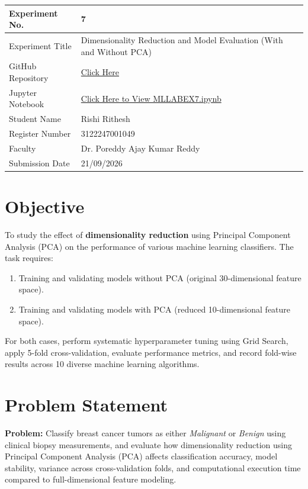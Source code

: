 \documentclass[12pt,a4paper]{article}
\begin{document}
\begin{tabular}{|p{4cm}|p{11cm}|}
\hline
Experiment No. & 7\\ \hline
Experiment Title & Dimensionality Reduction and Model Evaluation (With and Without PCA)\\ \hline
GitHub Repository & \href{https://github.com/rishirithesh/ML_Lab}{Click Here} \\ \hline
Jupyter Notebook & \href{https://github.com/rishirithesh/ML_Lab/blob/main/MLLABEX7.ipynb}{Click Here to View MLLABEX7.ipynb} \\ \hline
Student Name & Rishi Rithesh\\ \hline
Register Number & 3122247001049\\ \hline
Faculty & Dr. Poreddy Ajay Kumar Reddy \\ \hline
Submission Date & 21/09/2026\\ \hline
\end{tabular}

\vspace{0.4cm}

\section{Objective}
To study the effect of \textbf{dimensionality reduction} using Principal Component Analysis (PCA) on the performance of various machine learning classifiers. The task requires:
\begin{enumerate}[label=\alph*)]
    \item Training and validating models without PCA (original 30-dimensional feature space).
    \item Training and validating models with PCA (reduced 10-dimensional feature space).
\end{enumerate}
For both cases, perform systematic hyperparameter tuning using Grid Search, apply 5-fold cross-validation, evaluate performance metrics, and record fold-wise results across 10 diverse machine learning algorithms.

\section{Problem Statement}
\textbf{Problem:} Classify breast cancer tumors as either \textit{Malignant} or \textit{Benign} using clinical biopsy measurements, and evaluate how dimensionality reduction using Principal Component Analysis (PCA) affects classification accuracy, model stability, variance across cross-validation folds, and computational execution time compared to full-dimensional feature modeling.
\end{document}
